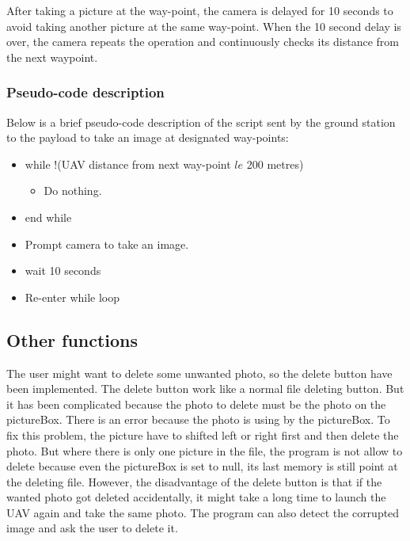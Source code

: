 After taking a picture at the way-point, the camera
is delayed for 10 seconds to avoid taking another picture
at the same way-point. When the 10 second delay is over,
the camera repeats the operation and continuously checks
its distance from the next waypoint.

\subsubsection{Pseudo-code description}

Below is a brief pseudo-code description of the script
sent by the ground station to the payload to take an
image at designated way-points:

\begin{itemize}
	\item while !(UAV distance from next way-point $le$ 200 metres)
		\begin{itemize}
			\item Do nothing.
		\end{itemize}
	\item end while
	\item Prompt camera to take an image.
	\item wait 10 seconds
	\item Re-enter while loop
\end{itemize}

\subsection{Other functions}
The user might want to delete some unwanted photo, so the delete button have been implemented. The delete button work like a normal file deleting button. But it has been complicated because the photo to delete must be the photo on the pictureBox. There is an error because the photo is using by the pictureBox. To fix this problem, the picture have to shifted left or right first and then delete the photo. But where there is only one picture in the file, the program is not allow to delete because even the pictureBox is set to null, its last memory is still point at the deleting file. However, the disadvantage of the delete button is that if the wanted photo got deleted accidentally, it might take a long time to launch the UAV again and take the same photo. The program can also detect the corrupted image and ask the user to delete it.

